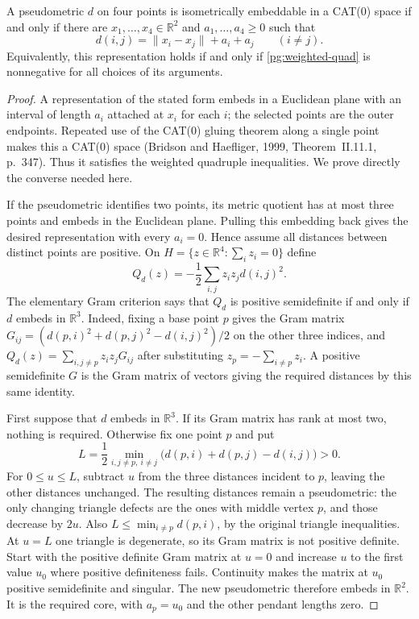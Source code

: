 \begin{theorem}
\label{pg:four-core}
A pseudometric $d$ on four points is isometrically embeddable in a
CAT(0) space if and only if there are $x_1,\ldots,x_4\in\mathbb R^2$
and $a_1,\ldots,a_4\geq0$ such that
\[
 d(i,j)=\|x_i-x_j\|+a_i+a_j\qquad(i\ne j).
\]
Equivalently, this representation holds if and only if
\eqref{pg:weighted-quad} is nonnegative for all choices of its arguments.
\end{theorem}
\begin{proof}
A representation of the stated form embeds in a Euclidean plane with
an interval of length $a_i$ attached at $x_i$ for each $i$; the selected
points are the outer endpoints. Repeated use of the CAT(0) gluing theorem
along a single point makes this a CAT(0) space (Bridson and Haefliger,
1999, Theorem~II.11.1, p.~347). Thus it satisfies the weighted quadruple
inequalities. We prove directly the converse needed here.

If the pseudometric identifies two points, its metric quotient has at
most three points and embeds in the Euclidean plane. Pulling this
embedding back gives the desired representation with every $a_i=0$.
Hence assume all distances between distinct points are positive.
On $H=\{z\in\mathbb R^4:\sum_i z_i=0\}$ define
\[
 Q_d(z)=-\frac12\sum_{i,j}z_i z_jd(i,j)^2.
\]
The elementary Gram criterion says that $Q_d$ is positive semidefinite
if and only if $d$ embeds in $\mathbb R^3$. Indeed, fixing a base point
$p$ gives the Gram matrix
$G_{ij}=(d(p,i)^2+d(p,j)^2-d(i,j)^2)/2$ on the other three indices,
and $Q_d(z)=\sum_{i,j\ne p}z_i z_jG_{ij}$ after substituting
$z_p=-\sum_{i\ne p}z_i$. A positive semidefinite $G$ is the Gram
matrix of vectors giving the required distances by this same identity.

First suppose that $d$ embeds in $\mathbb R^3$. If its Gram matrix
has rank at most two, nothing is required. Otherwise fix one point $p$
and put
\[
 L=\frac12\min_{i,j\ne p,\ i\ne j}
       \bigl(d(p,i)+d(p,j)-d(i,j)\bigr)>0.
\]
For $0\leq u\leq L$, subtract $u$ from the three distances incident
to $p$, leaving the other distances unchanged. The resulting distances
remain a pseudometric: the only changing triangle defects are the
ones with middle vertex $p$, and those decrease by $2u$. Also
$L\leq\min_{i\ne p}d(p,i)$, by the original triangle inequalities.
At $u=L$ one triangle is degenerate, so its Gram matrix is not positive
definite. Start with the positive definite Gram matrix at $u=0$ and
increase $u$ to the first value $u_0$ where positive definiteness fails.
Continuity makes the matrix at $u_0$ positive semidefinite and singular.
The new pseudometric therefore embeds in $\mathbb R^2$. It is the
required core, with $a_p=u_0$ and the other pendant lengths zero.


\end{proof}
